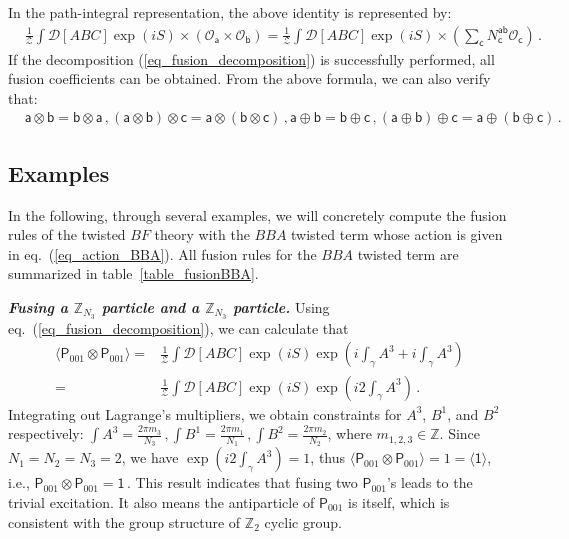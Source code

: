 \documentclass[11pt,nofootinbib,preprint]{revtex4-1}
\begin{document}
In the path-integral representation, the above identity is represented by:   
\begin{align}
	 &\frac{1}{\mathcal{Z}}\int\mathcal{D} \left[ ABC\right] \exp \left( iS \right) \times \left( \mathcal{O} _{\mathsf{a}}\times \mathcal{O} _{\mathsf{b}} \right) =\frac{1}{\mathcal{Z}}\int \mathcal{D} \left[ ABC\right] \exp \left( iS \right) \times \left( \sum_\mathsf{c}{N_{\mathsf{c}}^{\mathsf{a}\mathsf{b}}}\mathcal{O} _{\mathsf{c}} \right)  \,.
	 	\label{eq_fusion_decomposition}
\end{align}
If the  decomposition (\ref{eq_fusion_decomposition}) is successfully performed,  all fusion coefficients can be obtained.  From the above formula, we can also verify that: 
\begin{align}
	&\mathsf{a}\otimes \mathsf{b}=\mathsf{b}\otimes \mathsf{a}\,, \left(\mathsf{a}\otimes \mathsf{b}\right)\otimes \mathsf{c}=\mathsf{a}\otimes\left(\mathsf{b}\otimes \mathsf{c}\right)\,,\mathsf{a}\oplus \mathsf{b}=\mathsf{b}\oplus \mathsf{c}\,,\left(\mathsf{a}\oplus \mathsf{b}\right)\oplus \mathsf{c}=\mathsf{a}\oplus\left(\mathsf{b}\oplus \mathsf{c}\right)\,.
	\label{eq_fusion_algebra_rule}
\end{align} 
\subsection{Examples\label{ss31}}
In the following, through     several examples, we will  concretely compute the fusion rules of the twisted $BF$ theory with the $BBA$ twisted term whose action is given in eq.~(\ref{eq_action_BBA}).  All fusion rules for the $BBA$ twisted term are summarized   in table~\ref{table_fusionBBA}.




\textbf{\textit{Fusing a $\mathbb{Z} _{N_3}$ particle and a $\mathbb{Z} _{N_3}$ particle.}}
Using eq.~(\ref{eq_fusion_decomposition}), we can calculate that
\begin{align}
	\langle \mathsf{P}_{001}\otimes \mathsf{P}_{001} \rangle 
	=&\frac{1}{\mathcal{Z}}\int{\mathcal{D} \left[ ABC   \right] \exp \left( iS \right) \exp \left( i\int_{\gamma}{A^3}+i\int_{\gamma}{A^3} \right) } \nonumber
	\\
	=&\frac{1}{\mathcal{Z}}\int{\mathcal{D} \left[ ABC   \right]  \exp \left( iS \right) \exp \left( i2\int_{\gamma}{A^3} \right) }  \,.
\end{align}
Integrating out Lagrange's multipliers, we obtain constraints for $A^3$, $B^1$, and $B^2$ respectively:
$\int{A^3}=\frac{2\pi m_3}{N_3}  \,,
	\int{B^1}=\frac{2\pi m_1}{N_1}  \,,
	\int{B^2}=\frac{2\pi m_2}{N_2} $, 
where $m_{1,2,3}\in\mathbb{Z}$. Since $N_1=N_2=N_3=2$, we have $\exp \left( i2\int_{\gamma}{A^3} \right) =1$, thus
 $	\langle\mathsf{P}_{001}\otimes \mathsf{P}_{001} \rangle =1=\langle\mathsf{1} \rangle$,
i.e., 
$	\mathsf{P}_{001}\otimes \mathsf{P}_{001}=\mathsf{1}\,$.  This result indicates that fusing two $\mathsf{P}_{001}$'s leads to the trivial excitation. It also   means the antiparticle of $\mathsf{P}_{001}$ is itself, which is   consistent with the group structure of $\mathbb{Z}_2$ cyclic group.
\end{document}
